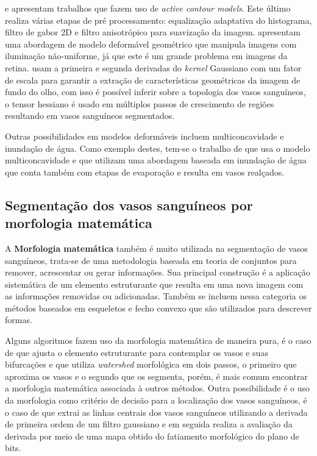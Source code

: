   e  apresentam trabalhos que fazem uso de \textit{active contour models}. Este último realiza várias etapas de pré processamento: equalização adaptativa do histograma, filtro de gabor 2D e filtro anisotrópico para suavização da imagem.  apresentam uma abordagem de modelo deformável geométrico que manipula imagens com iluminação não-uniforme, já que este é um grande problema em imagens da retina.   usam a primeira e segunda derivadas do \textit{kernel} Gaussiano com um fator de escala para garantir a extração de características geométricas da imagem de fundo do olho, com isso é possível inferir sobre a topologia dos vasos sanguíneos,  o tensor hessiano é usado em  %
múltiplos passos de crescimento de regiões  resultando em vasos sanguíneos segmentados. 


Outras possibilidades em modelos deformáveis incluem multiconcavidade e inundação de água. Como exemplo destes, tem-se o trabalho de  que usa o modelo multiconcavidade e  que  utilizam uma abordagem baseada em inundação de água que conta também com etapas de evaporação e resulta em vasos realçados. 

\subsection{Segmentação dos vasos sanguíneos por morfologia matemática}

A \textbf{Morfologia matemática} também é muito utilizada na segmentação de vasos sanguíneos, trata-se de uma metodologia baseada em teoria de conjuntos para remover, acrescentar ou gerar informações.  Sua principal construção é a aplicação sistemática de um elemento estruturante que resulta em uma nova imagem com as informações removidas ou adicionadas. Também se incluem nessa categoria os métodos baseados em esqueletos e fecho convexo que são utilizados para descrever formas.


Alguns algoritmos fazem uso da morfologia matemática de maneira pura, é o caso de  que ajusta o elemento estruturante para contemplar os vasos e suas bifurcações e  que utiliza \textit{watershed} morfológica em dois passos, o primeiro que aproxima os vasos e o segundo que os segmenta, porém, é mais comum encontrar a morfologia matemática associada à outros métodos. Outra possibilidade é o uso da morfologia como critério de decisão para a localização dos vasos sanguíneos, é o caso de  que extrai as linhas centrais dos vasos sanguíneos utilizando a derivada de primeira ordem de um filtro gaussiano e em seguida realiza a avaliação da derivada por meio de uma mapa obtido do fatiamento morfológico do plano de bits. 


